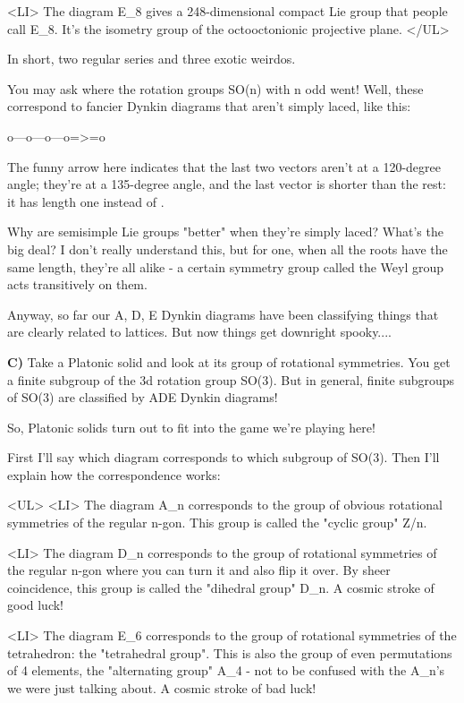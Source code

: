 <LI>
 The diagram E_{8} gives a 248-dimensional compact Lie group
  that people call E_{8}.  It's the isometry group of the octooctonionic 
  projective plane.
</UL>

In short, two regular series and three exotic weirdos.  

You may ask where the rotation groups SO(n) with n odd went!  
Well, these correspond to fancier Dynkin diagrams that aren't
simply laced, like this:

 o---o---o---o=>=o

The funny arrow here indicates that the last two vectors aren't 
at a 120-degree angle; they're at a 135-degree angle, and the last
vector is shorter than the rest: it has length one instead of .

Why are semisimple Lie groups "better" when they're simply laced?
What's the big deal?  I don't really understand this, but for one,
when all the roots have the same length, they're all alike - 
a certain symmetry group called the Weyl group acts transitively on them.  

Anyway, so far our A, D, E Dynkin diagrams have been classifying
things that are clearly related to lattices.  But now things get
downright spooky....

\textbf{C)} 
Take a Platonic solid and look at its group of rotational symmetries.
You get a finite subgroup of the 3d rotation group SO(3).  But in 
general, finite subgroups of SO(3) are classified by ADE Dynkin 
diagrams!  

So, Platonic solids turn out to fit into the game we're playing here!

First I'll say which diagram corresponds to which subgroup of SO(3).
Then I'll explain how the correspondence works:

<UL>
<LI>
 The diagram A_{n} corresponds to the group of obvious rotational symmetries
  of the regular n-gon.  This group is called the "cyclic group" Z/n.

<LI>
 The diagram D_{n} corresponds to the group of rotational symmetries 
  of the regular n-gon where you can turn it and also flip it over.
  By sheer coincidence, this group is called the "dihedral group" D_{n}. 
  A cosmic stroke of good luck!

<LI>
 The diagram E_{6} corresponds to the group of rotational symmetries 
  of the tetrahedron: the "tetrahedral group".  This is also the 
  group of even permutations of 4 elements, the "alternating group"
  A_{4} - not to be
  confused with the A_{n}'s we were just talking about.  A cosmic 
  stroke of bad luck!


